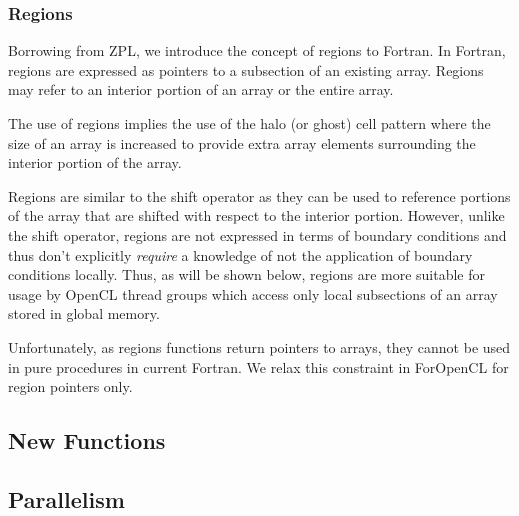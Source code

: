 \documentclass[10pt, conference, compsocconf]{IEEEtran}
\begin{document}
\subsubsection*{Regions}

Borrowing from ZPL, we introduce the concept of regions to Fortran.  In
Fortran, regions are expressed as pointers to a subsection of an existing array.
Regions may refer to an interior portion of an array or the entire array.

The use of regions implies the use of the halo (or ghost) cell pattern 
where the size of an array is increased to provide extra array elements
surrounding the interior portion of the array.  

Regions are similar to the shift operator as they can be used to reference
portions of the array that are shifted with respect to the interior portion.
However, unlike the shift operator, regions are not expressed in terms of
boundary conditions and thus don't explicitly \emph{require} a knowledge of
not the application of boundary conditions locally.  Thus, as will be shown
below, regions are more suitable for usage by OpenCL thread groups which
access only local subsections of an array stored in global memory.

Unfortunately, as regions functions return pointers to arrays, they cannot
be used in pure procedures in current Fortran.  We relax this constraint in
ForOpenCL for region pointers only.

\subsection{New Functions}

%


\subsection{Parallelism}


\end{document}
